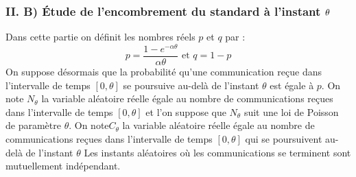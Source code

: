\documentclass[a4paper, 11pt,reqno]{article}
\begin{document}
\subsubsection*{II. B) Étude de l'encombrement du standard à l'instant $%
\protect\theta $}

Dans cette partie on définit les nombres réels $p$ et $q$ par : 
\begin{equation*}
p=\dfrac{1-e^{-\alpha \theta }}{\alpha \theta }\text{ et }q=1-p
\end{equation*}%
On suppose désormais que la probabilité qu'une communication reçue dans
l'intervalle de temps $\left[ 0,\theta \right] $ se poursuive au-delà de
l'instant $\theta $ est égale à $p$.\newline
On note $N_{\theta }$ la variable aléatoire réelle égale au nombre de
communications reçues dans l'intervalle de temps $\left[ 0,\theta \right] $
et l'on suppose que $N_{\theta }$ suit une loi de Poisson de paramètre $%
\theta $.\newline
On note$C_{\theta }$ la variable aléatoire réelle égale au nombre de
communications reçues dans l'intervalle de temps $\left[ 0,\theta \right] $
qui se poursuivent au-delà de l'instant $\theta $\newline
Les instants aléatoires où les communications se terminent sont mutuellement
indépendant.
\end{document}
